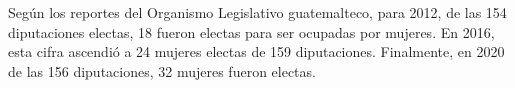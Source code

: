 Según los reportes del Organismo Legislativo guatemalteco, para 2012, de las 154 diputaciones electas, 18 fueron electas para ser ocupadas por mujeres. En 2016, esta cifra ascendió a 24 mujeres electas de 159 diputaciones. Finalmente, en 2020 de las 156 diputaciones, 32 mujeres fueron electas. 